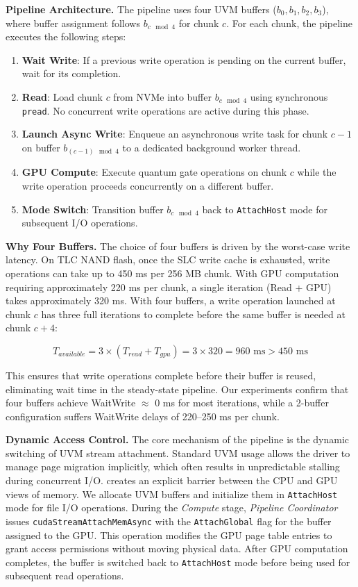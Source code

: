 \noindent\textbf{Pipeline Architecture.}
The pipeline uses four UVM buffers ($b_0, b_1, b_2, b_3$), where buffer assignment follows $b_{c \mod 4}$ for chunk $c$.
For each chunk, the pipeline executes the following steps:

\begin{enumerate}
    \item \textbf{Wait Write}: If a previous write operation is pending on the current buffer, wait for its completion.
    \item \textbf{Read}: Load chunk $c$ from NVMe into buffer $b_{c \mod 4}$ using synchronous \texttt{pread}. No concurrent write operations are active during this phase.
    \item \textbf{Launch Async Write}: Enqueue an asynchronous write task for chunk $c-1$ on buffer $b_{(c-1) \mod 4}$ to a dedicated background worker thread.
    \item \textbf{GPU Compute}: Execute quantum gate operations on chunk $c$ while the write operation proceeds concurrently on a different buffer.
    \item \textbf{Mode Switch}: Transition buffer $b_{c \mod 4}$ back to \texttt{AttachHost} mode for subsequent I/O operations.
\end{enumerate}

\noindent\textbf{Why Four Buffers.}
The choice of four buffers is driven by the worst-case write latency.
On TLC NAND flash, once the SLC write cache is exhausted, write operations can take up to 450 ms per 256 MB chunk.
With GPU computation requiring approximately 220 ms per chunk, a single iteration (Read + GPU) takes approximately 320 ms.
With four buffers, a write operation launched at chunk $c$ has three full iterations to complete before the same buffer is needed at chunk $c+4$:

\begin{equation}
T_{available} = 3 \times (T_{read} + T_{gpu}) = 3 \times 320 = 960 \text{ ms} > 450 \text{ ms}
\end{equation}

This ensures that write operations complete before their buffer is reused, eliminating wait time in the steady-state pipeline.
Our experiments confirm that four buffers achieve WaitWrite $\approx$ 0 ms for most iterations, while a 2-buffer configuration suffers WaitWrite delays of 220--250 ms per chunk.

\noindent\textbf{Dynamic Access Control.}
The core mechanism of the pipeline is the dynamic switching of UVM stream attachment.
Standard UVM usage allows the driver to manage page migration implicitly, which often results in unpredictable stalling during concurrent I/O.
\EdgeQuantum creates an explicit barrier between the CPU and GPU views of memory.
We allocate UVM buffers and initialize them in \texttt{AttachHost} mode for file I/O operations.
During the \textit{Compute} stage, \textit{Pipeline Coordinator} issues \texttt{cudaStreamAttachMemAsync} with the \texttt{AttachGlobal} flag for the buffer assigned to the GPU.
This operation modifies the GPU page table entries to grant access permissions without moving physical data.
After GPU computation completes, the buffer is switched back to \texttt{AttachHost} mode before being used for subsequent read operations.

